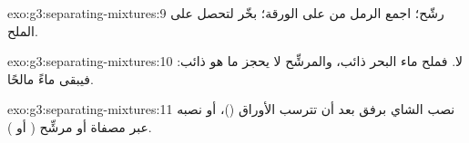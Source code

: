 \begin{solution}{exo:g3:separating-mixtures:9}
رشّح؛ اجمع الرمل من على الورقة؛ بخّر  لتحصل على
الملح.
\end{solution}

\begin{solution}{exo:g3:separating-mixtures:10}
لا. فملح ماء البحر ذائب، والمرشِّح لا يحجز ما هو ذائب: فيبقى 
ماءً مالحًا.
\end{solution}

\begin{solution}{exo:g3:separating-mixtures:11}
نصب الشاي برفق بعد أن تترسب الأوراق ()، أو نصبه عبر مصفاة أو
مرشِّح ( أو ).
\end{solution}
